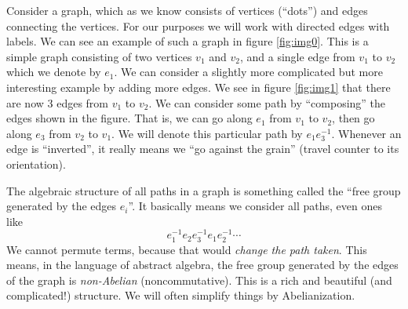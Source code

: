 
Consider a graph, which as we know consists of vertices
(``dots'') and edges connecting the vertices. For our purposes we
will work with directed edges with labels. We can see an example
of such a graph in figure \ref{fig:img0}. This is a simple graph
consisting of two vertices $v_{1}$ and $v_{2}$, and a single edge
from $v_{1}$ to $v_{2}$ which we denote by $e_{1}$. We can
consider a slightly more complicated but more interesting example
by adding more edges. We see in figure \ref{fig:img1} that there
are now 3 edges from $v_{1}$ to $v_{2}$. We can consider some
path by ``composing'' the edges shown in the figure. That is, we
can go along $e_{1}$ from $v_{1}$ to $v_{2}$, then go along
$e_{3}$ from $v_{2}$ to $v_{1}$. We will denote this particular
path by $e_{1}e_{3}^{-1}$. 
Whenever an edge is ``inverted'', it really means we ``go against
the grain'' (travel counter to its orientation).

The algebraic structure of all paths in a graph is something
called the ``free group generated by the edges $e_{i}$''. It
basically means we consider all paths, even ones like
\begin{equation}%
e_{1}^{-1}e_{2}e_{3}^{-1}e_{1}e_{2}^{-1}\cdots
\end{equation}
We cannot permute terms, because that would \emph{change the path taken}.
This means, in the language of abstract algebra, the free group
generated by the edges of the graph is \emph{non-Abelian}
(noncommutative). This is a rich and beautiful (and complicated!)
structure. We will often simplify things by Abelianization.


